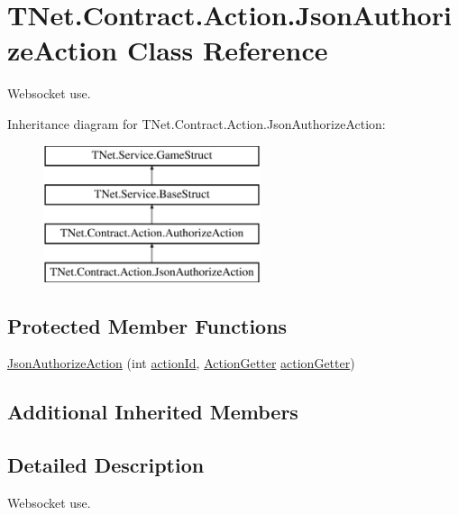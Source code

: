 \hypertarget{class_t_net_1_1_contract_1_1_action_1_1_json_authorize_action}{}\section{T\+Net.\+Contract.\+Action.\+Json\+Authorize\+Action Class Reference}
\label{class_t_net_1_1_contract_1_1_action_1_1_json_authorize_action}


Websocket use.  


Inheritance diagram for T\+Net.\+Contract.\+Action.\+Json\+Authorize\+Action\+:\begin{figure}[H]
\begin{center}
\leavevmode
\includegraphics[height=4.000000cm]{class_t_net_1_1_contract_1_1_action_1_1_json_authorize_action}
\end{center}
\end{figure}
\subsection*{Protected Member Functions}
\begin{DoxyCompactItemize}
\item 
\mbox{\hyperlink{class_t_net_1_1_contract_1_1_action_1_1_json_authorize_action_aab4612059a2796006de7c5c97c16a61f}{Json\+Authorize\+Action}} (int \mbox{\hyperlink{class_t_net_1_1_service_1_1_game_struct_a8c3c761a891a0da9d72d17d34a0f7446}{action\+Id}}, \mbox{\hyperlink{class_t_net_1_1_service_1_1_action_getter}{Action\+Getter}} \mbox{\hyperlink{class_t_net_1_1_service_1_1_game_struct_a14dcf224eb5a73e2c0b3bee4fe359dd8}{action\+Getter}})
\end{DoxyCompactItemize}
\subsection*{Additional Inherited Members}


\subsection{Detailed Description}
Websocket use. 



